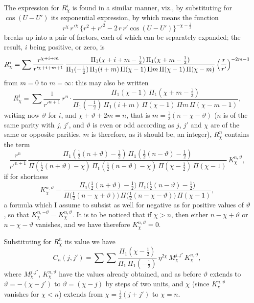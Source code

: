 \documentclass[12pt,a4paper]{article}
\theoremstyle{plain}
\begin{document}
\medskip
The expression for $R_{\chi}^{i}$ is found in a similar manner, viz., by substituting for $\cos(U-U')$ its exponential expression, by which means the function
\[
r^{\chi}\,r'^{\chi}\,\bigl\{r^{2}+r'^{2}-2\,r\,r'\cos(U-U')\bigr\}^{-\chi-\tfrac{1}{2}}
\]
breaks up into a pair of factors, each of which can be separately expanded; the result, $i$ being positive, or zero, is
\[
R_{\chi}^{i}=\sum\dfrac{r^{\chi+i+m}}{r'^{\chi+i+m+1}}\,\dfrac{\Pi_{1}(\chi+i+m-\tfrac{1}{2})\,\Pi_{1}(\chi+m-\tfrac{1}{2})}{\Pi_{1}(-\tfrac{1}{2})\,\Pi_{1}(i+m)\,\Pi(\chi-1)\,\Pi m\,\Pi(\chi-1)\,\Pi(\chi-m)}\,\Bigl(\dfrac{r}{r'}\Bigr)^{-2m-1}
\]
from $m=0$ to $m=\infty$: this may also be written
\[
R_{\chi}^{i}=\sum\dfrac{1}{r'^{n+1}}\,r^{n}\cdot\dfrac{\Pi_{1}(\chi-1)\,\Pi_{1}(\chi+m-\tfrac{1}{2})}{\Pi_{1}(-\tfrac{1}{2})\,\Pi_{1}(i+m)\,\Pi(\chi-1)\,\Pi m\,\Pi(\chi-m-1)},
\]
writing now $\vartheta$ for $i$, and $\chi+\vartheta+2m=n$, that is $m=\tfrac{1}{2}(n-\chi-\vartheta)$ ($n$ is of the same parity with $j$, $j'$, and $\vartheta$ is even or odd according as $j$, $j'$ and $\chi$ are of the same or opposite parities, $m$ is therefore, as it should be, an integer), $R_{\chi}^{n}$ contains the term
\[
\dfrac{r^{n}}{r'^{n+1}}\,\dfrac{\Pi_{1}(\tfrac{1}{2}(n+\vartheta)-\tfrac{1}{2})\,\Pi_{1}(\tfrac{1}{2}(n-\vartheta)-\tfrac{1}{2})}{\Pi(\tfrac{1}{2}(n+\vartheta)-\chi)\,\Pi_{1}(\tfrac{1}{2}(n-\vartheta)-\chi)\,\Pi(\chi-\tfrac{1}{2})\,\Pi(\chi-1)}\,K_{\chi}^{n,\vartheta},
\]
if for shortness
\[
K_{\chi}^{n,\vartheta}=\dfrac{\Pi_{1}\bigl(\tfrac{1}{2}(n+\vartheta)-\tfrac{1}{2}\bigr)\,\Pi_{1}\bigl(\tfrac{1}{2}(n-\vartheta)-\tfrac{1}{2}\bigr)}{\Pi\bigl(\tfrac{1}{2}(n-\chi+\vartheta)\bigr)\,\Pi\bigl(\tfrac{1}{2}(n-\chi-\vartheta)\bigr)\,\Pi(\chi-1)},
\]
a formula which I assume to subsist as well for negative as for positive values of $\vartheta$, so that $K_{\chi}^{n,-\vartheta}=K_{\chi}^{n,\vartheta}$. It is to be noticed that if $\chi>n$, then either $n-\chi+\vartheta$ or $n-\chi-\vartheta$ vanishes, and we have therefore $K_{\chi}^{n,\vartheta}=0$.

\medskip
Substituting for $R_{\chi}^{n}$ its value we have
\[
C_{n}(j,j')=\sum\sum\dfrac{\Pi_{1}(\chi-\tfrac{1}{2})}{\Pi_{1}\,\Pi_{1}(-\tfrac{1}{2})}\,\eta^{2\chi}\,M_{\chi}^{j,j'}\,K_{\chi}^{n,\vartheta},
\]
where $M_{\chi}^{j,j'}$, $K_{\chi}^{n,\vartheta}$ have the values already obtained, and as before $\vartheta$ extends to $\vartheta=-(\chi-j')$ to $\vartheta=(\chi-j)$ by steps of two units, and $\chi$ (since $K_{\chi}^{n,\vartheta}$ vanishes for $\chi<n$) extends from $\chi=\tfrac{1}{2}(j+j')$ to $\chi=n$.
\end{document}
